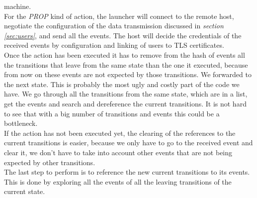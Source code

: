 machine.\\
For the \emph{PROP} kind of action, the launcher will connect to the remote host, negotiate the configuration of the data transmission
discussed in \emph{section \ref{sec:users}}, and send all the events. The host will decide the credentials of the received events by
configuration and linking of users to TLS certificates.\\
Once the action has been executed it has to remove from the hash of events all the transitions that leave from the same state than the
one it executed, because from now on these events are not expected by those transitions. We forwarded to the next state. This is probably 
the most ugly and costly part of the code we have. We go through all the transitions from the same state,
which are in a list, get the events and search and dereference the current transitions. It is not hard to see that with a big number of 
transitions and events this could be a bottleneck.\\
If the action has not been executed yet, the clearing of the references to the current transitions is easier, because we only have to go to
the received event and clear it, we don't have to take into account other events that are not being expected by other transitions.\\
The last step to perform is to reference the new current transitions to its events. This is done by exploring all the events
of all the leaving transitions of the current state.
